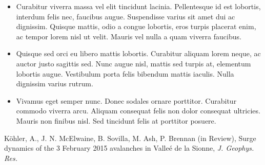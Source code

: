 \documentclass{article}
\begin{document}
\begin{frame}\label{\secvariable}
  
  \begin{itemize}
   \item Curabitur viverra massa vel elit tincidunt lacinia. Pellentesque id est lobortis, interdum felis nec, faucibus augue. Suspendisse varius sit amet dui ac dignissim. Quisque mattis, odio a congue lobortis, eros turpis placerat enim, ac tempor lorem nisl ut velit. Mauris vel nulla a quam viverra faucibus. 
  \item Quisque sed orci eu libero mattis lobortis. Curabitur aliquam lorem neque, ac auctor justo sagittis sed. Nunc augue nisl, mattis sed turpis at, elementum lobortis augue. Vestibulum porta felis bibendum mattis iaculis. Nulla dignissim varius rutrum.
  \item Vivamus eget semper nunc. Donec sodales ornare porttitor. Curabitur commodo viverra arcu. Aliquam consequat felis non dolor consequat ultricies. Mauris non finibus nisl. Sed tincidunt felis at porttitor posuere.

  \end{itemize}

  K\"ohler, A., J. N. McElwaine, B. Sovilla, M. Ash, P. Brennan (in Review),
Surge dynamics of the 3 February 2015 avalanches in Valle\'e de la Sionne,
\textit{J. Geophys. Res.} 
  
\end{frame}
\end{document}
